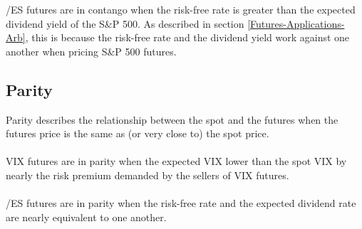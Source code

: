 \documentclass[11pt, oneside]{book}
\begin{document}
\noindent
/ES futures are in contango when the risk-free rate is greater than the expected dividend yield of the S\&P 500. As described in section \ref{Futures-Applications-Arb}, this is because the risk-free rate and the dividend yield work against one another when pricing S\&P 500 futures.


\subsection{Parity} \label{Futures-ConBackPar-Par}
Parity describes the relationship between the spot and the futures when the futures price is the same as (or very close to) the spot price. \\
\\
VIX futures are in parity when the expected VIX lower than the spot VIX by nearly the risk premium demanded by the sellers of VIX futures.\\
\\
/ES futures are in parity when the risk-free rate and the expected dividend rate are nearly equivalent to one another.
\end{document}
